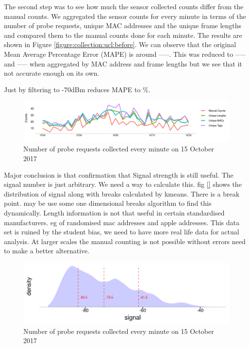 The second step was to see how much the sensor collected counts differ from the manual counts.
We aggregated the sensor counts for every minute in terms of the number of probe requests, unique MAC addresses and the unique frame lengths and compared them to the manual counts done for each minute.
The results are shown in Figure \ref{figure:collection:ucl:before}.
We can observe that the original Mean Average Percentage Error (MAPE) is around -----.
This was reduced to ----- and ----- when aggregated by MAC address and frame lengths but we see that it not accurate enough on its own.

\lipsum[1] Just by filtering to -70dBm reduces MAPE to \%.

\begin{figure}
  \includegraphics{images/ucl-comparison-after.png}
  \caption{Number of probe requests collected every minute on 15 October 2017}
  \label{figure:collection:ucl:config}
\end{figure}

Major conclusion is that confirmation that Signal strength is still useful.
The signal number is just arbitrary. We need a way to calculate this.
fig \ref{} shows the distribution of signal along with breaks calculated by kmeans.
There is a break point. may be use some one dimensional breaks algorithm to find this dynamically.
Length information is not that useful in certain standardised manufacturers.
eg of randomised mac addresses and apple addresses.
This data set is ruined by the student bias, we need to have more real life data for actual analysis.
At larger scales the manual counting is not possible without errors need to make a better alternative.

\begin{figure}
\includegraphics[trim={5 5 5 5},clip]{images/ucl-signal-dist.png}
  \caption{Number of probe requests collected every minute on 15 October 2017}
  \label{figure:collection:ucl:signal}
\end{figure}
\marginnote{\textit{} }


